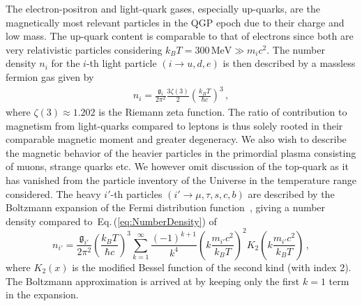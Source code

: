 \documentclass[epjST]{svjour}
\newcommand{\req}[1]{Eq.\,(\ref{#1})}
\begin{document}
The electron-positron and light-quark gases, especially up-quarks, are the magnetically most relevant particles in the QGP epoch due to their charge and low mass. The up-quark content is comparable to that of electrons since both are very relativistic particles considering \(k_{B}T=300\,\mathrm{MeV}\gg m_i c^{2}\). {\color{blue}The number density \(n_{i}\) for the \(i\)-th light particle \((i\rightarrow u,d,e)\) is then described by a massless fermion gas given by~\cite{Letessier:2002ony}
\begin{align}
\label{eq:NumberDensity}
n_{i} = \frac{\mathfrak{g}_{i}}{2\pi^{2}}\frac{3\zeta(3)}{2}\left(\frac{k_{B}T}{\hbar c}\right)^{3}\,,
\end{align}
}where \(\zeta(3)\approx1.202\) is the Riemann zeta function. The ratio of contribution to magnetism from light-quarks compared to leptons is thus solely rooted in their comparable magnetic moment and greater degeneracy. {\color{blue} We also wish to describe the magnetic behavior of the heavier particles in the primordial plasma consisting of muons, strange quarks etc. We however omit discussion of the top-quark as it has vanished from the particle inventory of the Universe in the temperature range considered. The heavy \(i'\)-th particles \((i'\rightarrow \mu,\tau,s,c,b)\) are described by the Boltzmann expansion of the Fermi distribution function~\cite{Letessier:2002ony,Yang:2024ret}, giving a number density compared to~\req{eq:NumberDensity} of
\begin{equation}
\label{eq:HeavyNumberDensity}
n_{i'} = \frac{\mathfrak{g}_{i'}}{2\pi^{2}}\left(\frac{k_{B}T}{\hbar c}\right)^{3}\sum_{k=1}^{\infty}\frac{(-1)^{k+1}}{k^4}\left(k\frac{m_{i'}c^{2}}{k_{B}T}\right)^{2}K_{2}\left(k\frac{m_{i'}c^{2}}{k_{B}T}\right)\,,
\end{equation}
where \(K_{2}(x)\) is the modified Bessel function of the second kind (with index 2). The Boltzmann approximation is arrived at by keeping only the first \(k=1\) term in the expansion.}
\end{document}
